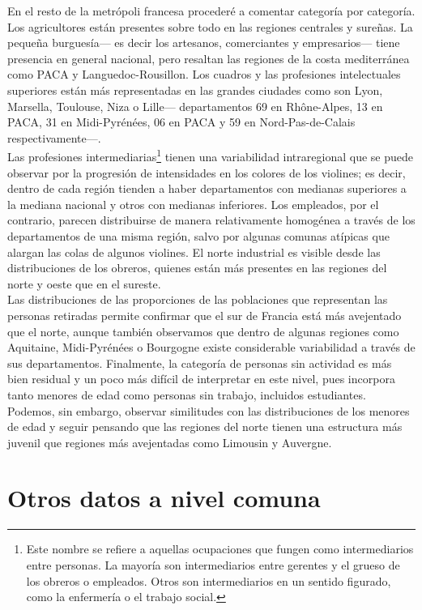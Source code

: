  En el resto de la metrópoli francesa procederé a comentar categoría por categoría. Los agricultores están presentes sobre todo en las regiones centrales y sureñas. La pequeña burguesía--- es decir los artesanos, comerciantes y empresarios--- tiene presencia en general nacional, pero resaltan las regiones de la costa mediterránea como PACA y Languedoc-Rousillon. Los cuadros y las profesiones intelectuales superiores están más representadas en las grandes ciudades como son Lyon, Marsella, Toulouse, Niza o Lille--- departamentos 69 en Rhône-Alpes, 13 en PACA, 31 en Midi-Pyrénées, 06 en PACA y 59 en Nord-Pas-de-Calais respectivamente---.\\ 
 
 Las profesiones intermediarias\footnote{Este nombre se refiere a aquellas ocupaciones que fungen como intermediarios entre personas. La mayoría son intermediarios entre gerentes y el grueso de los obreros o empleados. Otros son intermediarios en un sentido figurado, como la enfermería o el trabajo social.} tienen una variabilidad intraregional que se puede observar por la progresión de intensidades en los colores de los violines; es decir, dentro de cada región tienden a haber departamentos con medianas superiores a la mediana nacional y otros con medianas inferiores. Los empleados, por el contrario, parecen distribuirse de manera relativamente homogénea a través de los departamentos de una misma región, salvo por algunas comunas atípicas que alargan las colas de algunos violines. El norte industrial es visible desde las distribuciones de los obreros, quienes están más presentes en las regiones del norte y oeste que en el sureste.\\
 
  Las distribuciones de las proporciones de las poblaciones que representan las personas retiradas permite confirmar que el sur de Francia está más avejentado que el norte, aunque también observamos que dentro de algunas regiones como Aquitaine, Midi-Pyrénées o Bourgogne existe considerable variabilidad a través de sus departamentos. Finalmente, la categoría de personas sin actividad es más bien residual y un poco más difícil de interpretar en este nivel, pues incorpora tanto menores de edad como personas sin trabajo, incluidos estudiantes. Podemos, sin embargo, observar similitudes con las distribuciones de los menores de edad y seguir pensando que las regiones del norte tienen una estructura más juvenil que regiones más avejentadas como Limousin y Auvergne.

\clearpage
\section{Otros datos a nivel comuna}

